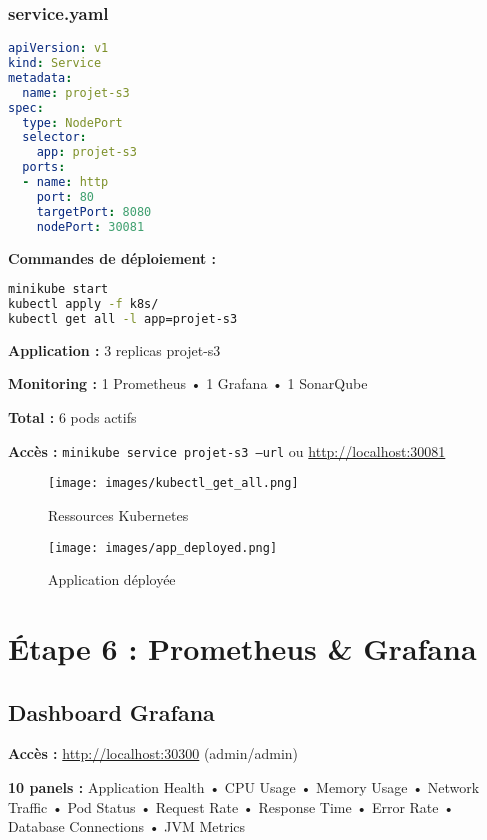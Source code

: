 \documentclass[11pt,a4paper]{article}
\begin{document}
\subsubsection{service.yaml}
\begin{lstlisting}[language=yaml]
apiVersion: v1
kind: Service
metadata:
  name: projet-s3
spec:
  type: NodePort
  selector:
    app: projet-s3
  ports:
  - name: http
    port: 80
    targetPort: 8080
    nodePort: 30081
\end{lstlisting}

\textbf{Commandes de déploiement :}
\begin{lstlisting}[language=bash]
minikube start
kubectl apply -f k8s/
kubectl get all -l app=projet-s3
\end{lstlisting}

\begin{tcolorbox}[colback=green!5!white,colframe=green!75!black,title=Pods déployés]
    \textbf{Application :} 3 replicas projet-s3
    
    \textbf{Monitoring :} 1 Prometheus • 1 Grafana • 1 SonarQube
    
    \textbf{Total :} 6 pods actifs
\end{tcolorbox}

\textbf{Accès :} \texttt{minikube service projet-s3 --url} ou \url{http://localhost:30081}

\begin{figure}[H]
    \centering
    \texttt{[image: images/kubectl\_get\_all.png]}
    \caption{Ressources Kubernetes}
\end{figure}

\begin{figure}[H]
    \centering
    \texttt{[image: images/app\_deployed.png]}
    \caption{Application déployée}
\end{figure}

\newpage

\section{Étape 6 : Prometheus \& Grafana}

\subsection{Dashboard Grafana}
\textbf{Accès :} \url{http://localhost:30300} (admin/admin)

\textbf{10 panels :} Application Health • CPU Usage • Memory Usage • Network Traffic • Pod Status • Request Rate • Response Time • Error Rate • Database Connections • JVM Metrics
\end{document}
